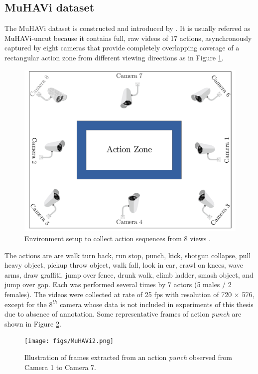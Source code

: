 
\subsection{MuHAVi dataset}
    The MuHAVi dataset is constructed and introduced by \cite{murtaza2016multi}. It is usually referred as MuHAVi-uncut because it contains full, raw videos of 17 actions, asynchronously captured by eight cameras that provide completely overlapping coverage of a rectangular action zone from different viewing directions as in Figure \ref{Fig:MuHAVi1}. 

    \begin{figure}[h]
        \centering
        \includegraphics[width=0.8\linewidth]{figs/MuHAVi1.png}
        \caption{Environment setup to collect action sequences from 8 views \cite{murtaza2016multi}.}
        \label{Fig:MuHAVi1}
    \end{figure}

    The actions are are walk turn back, run stop, punch, kick, shotgun collapse, pull heavy object, pickup throw object, walk fall, look in car, crawl on knees, wave arms, draw graffiti, jump over fence, drunk walk, climb ladder, smash object, and jump over gap. 
    Each was performed several times by 7 actors (5 males / 2 females). 
    The videos were collected at rate of 25 fps with resolution of 720 $\times$ 576, except for the $8^{th}$ camera whose data is not included in experiments of this thesis due to absence of annotation.
    Some representative frames of action \textit{punch} are shown in Figure \ref{Fig:MuHAVi2}.

    \begin{figure}[htbp]
        \centering
        \texttt{[image: figs/MuHAVi2.png]}
        \caption{Illustration of frames extracted from an action \textit{punch} observed from Camera 1 to Camera 7.}
        \label{Fig:MuHAVi2}
    \end{figure}
